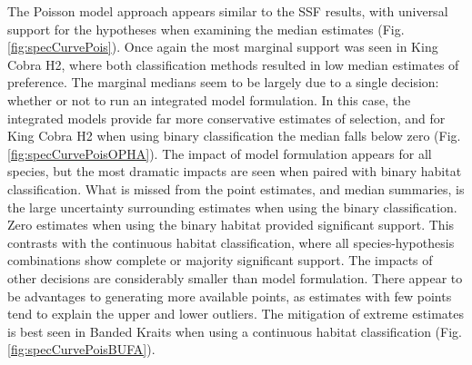 \documentclass[10pt,a4paper]{article}
\begin{document}
The Poisson model approach appears similar to the SSF results, with universal support for the hypotheses when examining the median estimates (Fig. \ref{fig:specCurvePois}).
Once again the most marginal support was seen in King Cobra H2, where both classification methods resulted in low median estimates of preference.
The marginal medians seem to be largely due to a single decision: whether or not to run an integrated model formulation.
In this case, the integrated models provide far more conservative estimates of selection, and for King Cobra H2 when using binary classification the median falls below zero (Fig. \ref{fig:specCurvePoisOPHA}).
The impact of model formulation appears for all species, but the most dramatic impacts are seen when paired with binary habitat classification.
What is missed from the point estimates, and median summaries, is the large uncertainty surrounding estimates when using the binary classification.
Zero estimates when using the binary habitat provided significant support.
This contrasts with the continuous habitat classification, where all species-hypothesis combinations show complete or majority significant support.
The impacts of other decisions are considerably smaller than model formulation.
There appear to be advantages to generating more available points, as estimates with few points tend to explain the upper and lower outliers.
The mitigation of extreme estimates is best seen in Banded Kraits when using a continuous habitat classification (Fig. \ref{fig:specCurvePoisBUFA}).
\end{document}
